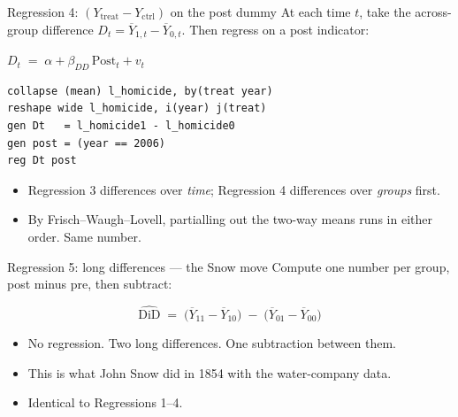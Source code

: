 \documentclass[aspectratio=169,11pt]{beamer}
\begin{document}
\begin{frame}[fragile]{Regression 4: $(Y_{\text{treat}} - Y_{\text{ctrl}})$ on the post dummy}
\vspace{0.3em}
At each time $t$, take the across-group difference $D_t = \overline{Y}_{1,t} - \overline{Y}_{0,t}$. Then regress on a post indicator:
\vspace{0.3em}
\begin{center}
$D_t \;=\; \alpha + \beta_{DD}\,\text{Post}_t + v_t$
\end{center}
\vspace{0.3em}
\begin{lstlisting}[language={[ANSI]C}]
collapse (mean) l_homicide, by(treat year)
reshape wide l_homicide, i(year) j(treat)
gen Dt   = l_homicide1 - l_homicide0
gen post = (year == 2006)
reg Dt post
\end{lstlisting}
\vspace{0.2em}
\begin{itemize}\small
  \item Regression 3 differences over \textit{time}; Regression 4 differences over \textit{groups} first.
  \item By Frisch--Waugh--Lovell, partialling out the two-way means runs in either order. \;Same number.
\end{itemize}
\end{frame}

\begin{frame}{Regression 5: long differences --- the Snow move}
\vspace{0.6em}
Compute one number per group, post minus pre, then subtract:
\vspace{0.4em}
\begin{center}
\Large
\[
\widehat{\text{DiD}} \;=\; \big(\overline{Y}_{11} - \overline{Y}_{10}\big) \;-\; \big(\overline{Y}_{01} - \overline{Y}_{00}\big)
\]
\end{center}
\vspace{0.6em}
\begin{itemize}
  \item No regression. \;Two long differences. \;One subtraction between them.
  \item This is what John Snow did in 1854 with the water-company data.
  \item Identical to Regressions 1--4. \;
\end{itemize}
\end{frame}
\end{document}
